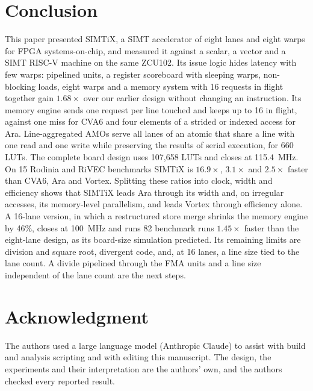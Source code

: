 \documentclass[journal]{IEEEtran}
\begin{document}
\section{Conclusion}
This paper presented SIMTiX, a SIMT accelerator of eight lanes and eight warps for
FPGA systems-on-chip, and measured it against a scalar, a vector and a SIMT RISC-V
machine on the same ZCU102. Its issue logic hides latency with few warps: pipelined
units, a register scoreboard with sleeping warps, non-blocking loads, eight warps and
a memory system with 16 requests in flight together gain $1.68\times$ over our earlier
design without changing an instruction. Its memory engine sends one request per line
touched and keeps up to 16 in flight, against one miss for CVA6 and four elements of a
strided or indexed access for Ara. Line-aggregated AMOs serve all lanes of an atomic
that share a line with one read and one write while preserving the results of serial
execution, for 660 LUTs. The complete board design uses 107,658 LUTs and closes at
115.4~MHz. On 15 Rodinia and RiVEC benchmarks SIMTiX is $16.9\times$, $3.1\times$ and
$2.5\times$ faster than CVA6, Ara and Vortex. Splitting these ratios into clock, width
and efficiency shows that SIMTiX leads Ara through its width and, on irregular
accesses, its memory-level parallelism, and leads Vortex through efficiency alone.
A 16-lane version, in which a restructured store merge shrinks the memory engine by
46\%, closes at 100~MHz and runs 82 benchmark runs $1.45\times$ faster than
the eight-lane design, as its board-size simulation predicted. Its remaining limits
are division and square root, divergent code, and, at 16 lanes, a line size tied to
the lane count. A divide pipelined through the FMA units and a line size independent
of the lane count are the next steps.

\section*{Acknowledgment}
The authors used a large language model (Anthropic Claude) to assist with build
and analysis scripting and with editing this manuscript. The design, the
experiments and their interpretation are the authors' own, and the authors checked
every reported result.
\end{document}
